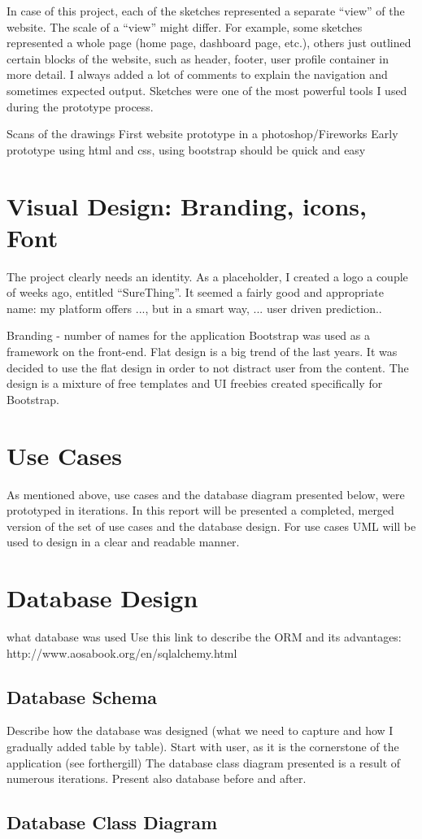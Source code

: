 In case of this project, each of the sketches represented a separate “view” of the website. The scale of a “view” might differ. For example, some sketches represented a whole page (home page, dashboard page, etc.), others just outlined certain blocks of the website, such as header, footer, user profile container in more detail. I always added a lot of comments to explain the navigation and sometimes expected output. Sketches were one of the most powerful tools I used during the prototype process. 


Scans of the drawings
First website prototype in a photoshop/Fireworks
Early prototype using html and css, using bootstrap should be quick and easy

\section{Visual Design: Branding, icons, Font}
\label{sec:visdesign_prototype}
The project clearly needs an identity. As a placeholder, I created a logo a couple of weeks ago, entitled “SureThing”. It seemed a fairly good and appropriate name: my platform offers ..., but in a smart way, ... user driven prediction..


Branding - number of names for the application
Bootstrap was used as a framework on the front-end.
Flat design is a big trend of the last years. It was decided to use the flat design in order to not distract user from the content.
The design is a mixture of free templates and UI freebies created specifically for Bootstrap.

\section{Use Cases}
\label{usecases_prototype}
As mentioned above, use cases and the database diagram presented below, were prototyped in iterations. In this report will be presented a completed, merged version of the set of use cases and the database design. For use cases UML will be used to design in a clear and readable manner.

\section{Database Design}
\label{databasedesign}
what database was used
Use this link to describe the ORM and its advantages: 
http://www.aosabook.org/en/sqlalchemy.html

\subsection{Database Schema}
Describe how the database was designed (what we need to capture and how I gradually added table by table). Start with user, as it is the cornerstone of the application (see forthergill)
The database class diagram presented is a result of numerous iterations.  
Present also database before and after.

\subsection{Database Class Diagram}

